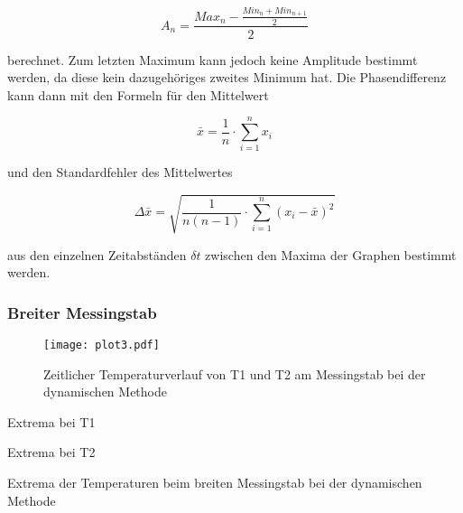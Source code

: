 \begin{equation}
  A_n=\frac{Max_n-\frac{Min_n+Min_{n+1}}{2}}{2}
  \label{eq:a}
\end{equation}

\noindent berechnet. Zum letzten Maximum kann jedoch keine Amplitude bestimmt werden, da diese kein dazugehöriges zweites Minimum hat.
Die Phasendifferenz kann dann mit den Formeln für den Mittelwert

\begin{equation}
  \bar{x}=\frac{1}{n} \cdot \sum_{i=1}^n x_i
  \label{eq:b}
\end{equation}

\noindent und den Standardfehler des Mittelwertes

\begin{equation}
  \Delta\bar{x}=\sqrt{\frac{1}{n(n-1)}\cdot \sum_{i=1}^n(x_i-\bar{x})^2}
  \label{eq:c}
\end{equation}

\noindent aus den einzelnen Zeitabständen $\delta t$ zwischen den Maxima der Graphen bestimmt werden.

\subsubsection{Breiter Messingstab}

\begin{figure}[H]
  \centering
  \texttt{[image: plot3.pdf]}
  \caption{Zeitlicher Temperaturverlauf von T1 und T2 am Messingstab bei der dynamischen Methode}
  \label{fig:e}
\end{figure}

  \begin{table}[H]
  \centering
    \begin{subtable}{.42\linewidth}
      \centering
            \caption{Extrema bei T1}

    \end{subtable}
    \begin{subtable}{.42\linewidth}
      \centering
           \caption{Extrema bei T2}

    \end{subtable} 
        \caption{Extrema der Temperaturen beim breiten Messingstab bei der dynamischen Methode}
    \label{tab:b}
\end{table}


